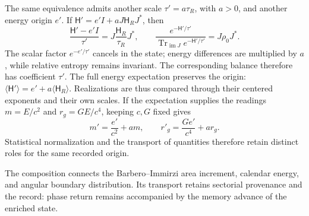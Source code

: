 The same equivalence admits another scale \(\tau'=a\tau_R\),
with \(a>0\), and another energy origin \(e'\). If
\(\mathsf H'=e'I+aJ\mathsf H_RJ^*\), then
\[
 \frac{\mathsf H'-e'I}{\tau'}
 =J\frac{\mathsf H_R}{\tau_R}J^*,\qquad
 \frac{e^{-\mathsf H'/\tau'}}
      {\operatorname{Tr}_{\operatorname{im}J}e^{-\mathsf H'/\tau'}}
 =J\rho_0J^*.
\]
The scalar factor \(e^{-e'/\tau'}\) cancels in the state;
energy differences are multiplied by \(a\), while relative entropy
remains invariant. The corresponding balance therefore has coefficient
\(\tau'\). The full energy expectation preserves the origin:
\(\langle\mathsf H'\rangle=e'+a\langle\mathsf H_R\rangle\).
Realizations are thus compared through their centered exponents and
their own scales.
If the expectation supplies the readings \(m=E/c^2\) and
\(r_g=GE/c^4\), keeping \(c,G\) fixed gives
\[
 m'=\frac{e'}{c^2}+am,\qquad
 r'_g=\frac{Ge'}{c^4}+ar_g.
\]
Statistical normalization and the transport of quantities therefore
retain distinct roles for the same recorded origin.

The composition connects the Barbero--Immirzi area increment, calendar
energy, and angular boundary distribution. Its transport retains
sectorial provenance and the record: phase return remains accompanied
by the memory advance of the enriched state.
